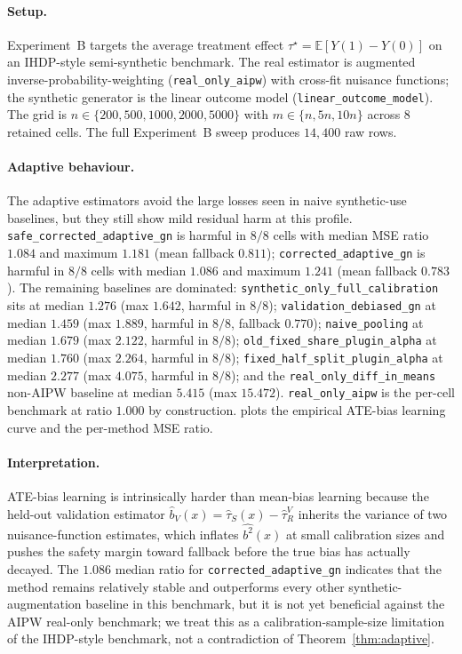 \paragraph{Setup.} Experiment~B targets the average treatment effect $\tau^\star = \mathbb{E}[Y(1) - Y(0)]$ on an IHDP-style semi-synthetic benchmark. The real estimator is augmented inverse-probability-weighting (\texttt{real\_only\_aipw}) with cross-fit nuisance functions; the synthetic generator is the linear outcome model (\texttt{linear\_outcome\_model}). The grid is $n \in \{200, 500, 1000, 2000, 5000\}$ with $m \in \{n, 5n, 10n\}$ across $8$ retained cells. The full Experiment~B sweep produces $14{,}400$ raw rows.

\paragraph{Adaptive behaviour.} The adaptive estimators avoid the large losses seen in naive synthetic-use baselines, but they still show mild residual harm at this profile. \texttt{safe\_corrected\_adaptive\_gn} is harmful in $8/8$ cells with median MSE ratio $1.084$ and maximum $1.181$ (mean fallback $0.811$); \texttt{corrected\_adaptive\_gn} is harmful in $8/8$ cells with median $1.086$ and maximum $1.241$ (mean fallback $0.783$). The remaining baselines are dominated: \texttt{synthetic\_only\_full\_calibration} sits at median $1.276$ (max $1.642$, harmful in $8/8$); \texttt{validation\_debiased\_gn} at median $1.459$ (max $1.889$, harmful in $8/8$, fallback $0.770$); \texttt{naive\_pooling} at median $1.679$ (max $2.122$, harmful in $8/8$); \texttt{old\_fixed\_share\_plugin\_alpha} at median $1.760$ (max $2.264$, harmful in $8/8$); \texttt{fixed\_half\_split\_plugin\_alpha} at median $2.277$ (max $4.075$, harmful in $8/8$); and the \texttt{real\_only\_diff\_in\_means} non-AIPW baseline at median $5.415$ (max $15.472$). \texttt{real\_only\_aipw} is the per-cell benchmark at ratio $1.000$ by construction.  plots the empirical ATE-bias learning curve and  the per-method MSE ratio.

\paragraph{Interpretation.} ATE-bias learning is intrinsically harder than mean-bias learning because the held-out validation estimator $\hat b_V(x) = \hat\tau_S(x) - \hat\tau_R^V$ inherits the variance of two nuisance-function estimates, which inflates $\widehat{b^2}(x)$ at small calibration sizes and pushes the safety margin toward fallback before the true bias has actually decayed. The $1.086$ median ratio for \texttt{corrected\_adaptive\_gn} indicates that the method remains relatively stable and outperforms every other synthetic-augmentation baseline in this benchmark, but it is not yet beneficial against the AIPW real-only benchmark; we treat this as a calibration-sample-size limitation of the IHDP-style benchmark, not a contradiction of Theorem~\ref{thm:adaptive}.

